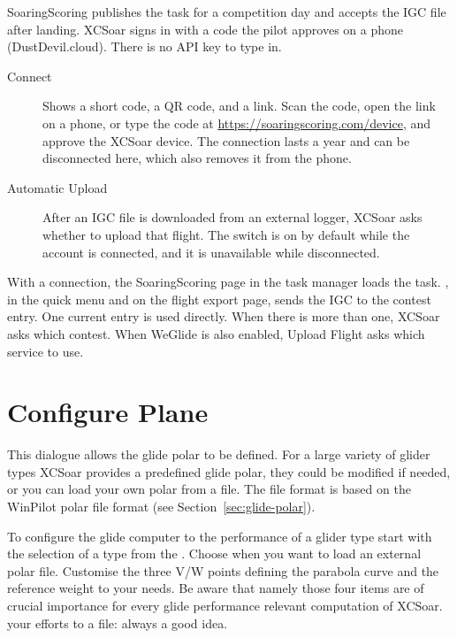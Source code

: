 SoaringScoring publishes the task for a competition day and accepts the
IGC file after landing. XCSoar signs in with a code the pilot approves
on a phone (DustDevil.cloud). There is no API key to type in.

\begin{description}
\item[Connect]  Shows a short code, a QR code, and a link. Scan the
  code, open the link on a phone, or type the code at
  \url{https://soaringscoring.com/device}, and approve the XCSoar
  device. The connection lasts a year and can be
  disconnected here, which also removes it from the phone.
\item[Automatic Upload]  After an IGC file is downloaded from an
  external logger, XCSoar asks whether to upload that flight.
  The switch is on by default while the account is connected, and it
  is unavailable while disconnected.
\end{description}

With a connection, the SoaringScoring page in the task manager loads
the task. , in the quick menu and on the flight
export page, sends the IGC to the contest entry. One current entry is
used directly. When there is more than one, XCSoar asks which contest.
When WeGlide is also enabled, Upload Flight asks which service to use.

\section{Configure Plane}

This dialogue allows the glide polar to be defined. For a large variety of glider
types XCSoar provides a predefined glide polar, they could be modified if 
needed, or you can load your own polar from a file. 
The file format is based on the WinPilot polar file format (see Section~\ref{sec:glide-polar}).

\label{conf:polar} To configure the glide computer to the performance of a glider 
type start with the selection of a type from the . 
Choose  when you want to load an external polar file.
Customise the three V/W points defining the parabola curve and the reference
weight to your needs. 
\tip Be aware that namely those four items are of crucial importance 
for every glide performance relevant computation of XCSoar.   
 your efforts to a file: always a good idea.

